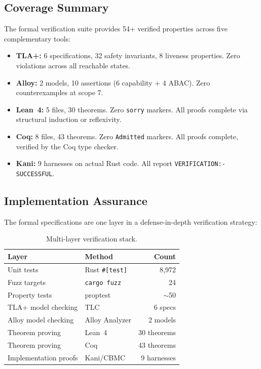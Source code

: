 \documentclass[sigplan,screen,nonacm]{acmart}
\begin{document}
\subsection{Coverage Summary}

The formal verification suite provides 54+ verified properties across five
complementary tools:

\begin{itemize}
  \item \textbf{TLA+:} 6 specifications, 32 safety invariants, 8 liveness
    properties. Zero violations across all reachable states.
  \item \textbf{Alloy:} 2 models, 10 assertions (6 capability + 4 ABAC).
    Zero counterexamples at scope 7.
  \item \textbf{Lean~4:} 5 files, 30 theorems. Zero \texttt{sorry} markers.
    All proofs complete via structural induction or reflexivity.
  \item \textbf{Coq:} 8 files, 43 theorems. Zero \texttt{Admitted} markers.
    All proofs complete, verified by the Coq type checker.
  \item \textbf{Kani:} 9 harnesses on actual Rust code. All report
    \texttt{VERIFICATION:- SUCCESSFUL}.
\end{itemize}

\subsection{Implementation Assurance}

The formal specifications are one layer in a defense-in-depth verification
strategy:

\begin{table}[h]
\caption{Multi-layer verification stack.}
\label{tab:verification-stack}
\small
\begin{tabular}{@{}llr@{}}
\toprule
Layer & Method & Count \\
\midrule
Unit tests & Rust \texttt{\#[test]} & 8,972 \\
Fuzz targets & \texttt{cargo fuzz} & 24 \\
Property tests & proptest & $\sim$50 \\
TLA+ model checking & TLC & 6 specs \\
Alloy model checking & Alloy Analyzer & 2 models \\
Theorem proving & Lean~4 & 30 theorems \\
Theorem proving & Coq & 43 theorems \\
Implementation proofs & Kani/CBMC & 9 harnesses \\
\bottomrule
\end{tabular}
\end{table}
\end{document}
